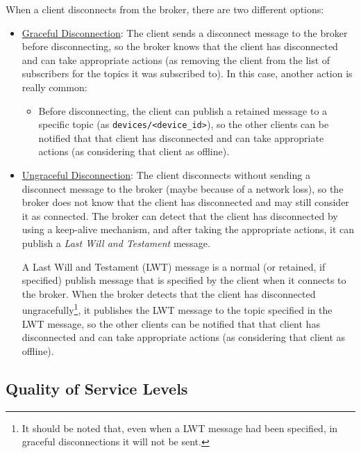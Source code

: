 When a client disconnects from the broker, there are two different options:
\begin{itemize}
    \item \ul{Graceful Disconnection}: The client sends a disconnect message to the broker before disconnecting, so the broker knows that the client has disconnected and can take appropriate actions (as removing the client from the list of subscribers for the topics it was subscribed to). In this case, another action is really common:
    \begin{itemize}
        \item Before disconnecting, the client can publish a retained message to a specific topic (as \texttt{devices/<device\_id>}), so the other clients can be notified that that client has disconnected and can take appropriate actions (as considering that client as offline).
    \end{itemize}
    \item \ul{Ungraceful Disconnection}: The client disconnects without sending a disconnect message to the broker (maybe because of a network loss), so the broker does not know that the client has disconnected and may still consider it as connected. The broker can detect that the client has disconnected by using a keep-alive mechanism, and after taking the appropriate actions, it can publish a \emph{Last Will and Testament} message.
    
    A Last Will and Testament (LWT) message is a normal (or retained, if specified) publish message that is specified by the client when it connects to the broker. When the broker detects that the client has disconnected ungracefully\footnote{It should be noted that, even when a LWT message had been specified, in graceful disconnections it will not be sent.}, it publishes the LWT message to the topic specified in the LWT message, so the other clients can be notified that that client has disconnected and can take appropriate actions (as considering that client as offline).
\end{itemize}

\subsection{Quality of Service Levels}


